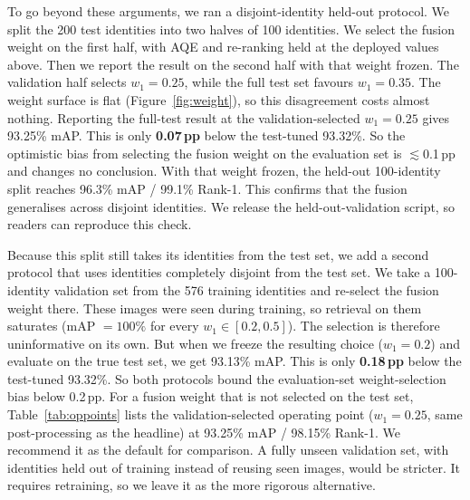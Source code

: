 To go beyond these arguments, we ran a disjoint-identity held-out protocol. We split the 200 test identities into two halves of 100 identities. We select the fusion weight on the first half, with AQE and re-ranking held at the deployed values above. Then we report the result on the second half with that weight frozen. The validation half selects $w_1{=}0.25$, while the full test set favours $w_1{=}0.35$. The weight surface is flat (Figure~\ref{fig:weight}), so this disagreement costs almost nothing. Reporting the full-test result at the validation-selected $w_1{=}0.25$ gives 93.25\% mAP. This is only \textbf{0.07\,pp} below the test-tuned 93.32\%. So the optimistic bias from selecting the fusion weight on the evaluation set is $\lesssim$0.1\,pp and changes no conclusion. With that weight frozen, the held-out 100-identity split reaches 96.3\% mAP / 99.1\% Rank-1. This confirms that the fusion generalises across disjoint identities. We release the held-out-validation script, so readers can reproduce this check.

Because this split still takes its identities from the test set, we add a second protocol that uses identities completely disjoint from the test set. We take a 100-identity validation set from the 576 training identities and re-select the fusion weight there. These images were seen during training, so retrieval on them saturates (mAP $=100\%$ for every $w_1\in[0.2,0.5]$). The selection is therefore uninformative on its own. But when we freeze the resulting choice ($w_1{=}0.2$) and evaluate on the true test set, we get 93.13\% mAP. This is only \textbf{0.18\,pp} below the test-tuned 93.32\%. So both protocols bound the evaluation-set weight-selection bias below 0.2\,pp. For a fusion weight that is not selected on the test set, Table~\ref{tab:oppoints} lists the validation-selected operating point ($w_1{=}0.25$, same post-processing as the headline) at 93.25\% mAP / 98.15\% Rank-1. We recommend it as the default for comparison. A fully unseen validation set, with identities held out of training instead of reusing seen images, would be stricter. It requires retraining, so we leave it as the more rigorous alternative.
